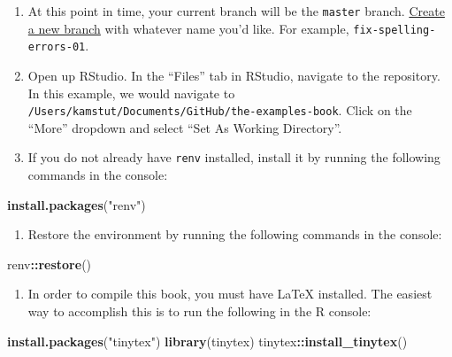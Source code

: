 \documentclass[]{book}
\newenvironment{Shaded}{\begin{snugshade}}{\end{snugshade}}
\newcommand{\KeywordTok}[1]{\textcolor[rgb]{0.13,0.29,0.53}{\textbf{#1}}}
\newcommand{\StringTok}[1]{\textcolor[rgb]{0.31,0.60,0.02}{#1}}
\newcommand{\OperatorTok}[1]{\textcolor[rgb]{0.81,0.36,0.00}{\textbf{#1}}}
\newcommand{\NormalTok}[1]{#1}
\providecommand{\tightlist}{%
  \setlength{\itemsep}{0pt}\setlength{\parskip}{0pt}}
\begin{document}
\begin{enumerate}
\def\labelenumi{\arabic{enumi}.}
\setcounter{enumi}{7}
\tightlist
\item
  At this point in time, your current branch will be the \texttt{master}
  branch. \protect\hyperlink{github-desktop-create-new-branch}{Create a
  new branch} with whatever name you'd like. For example,
  \texttt{fix-spelling-errors-01}.
\item
  Open up RStudio. In the ``Files'' tab in RStudio, navigate to the
  repository. In this example, we would navigate to
  \texttt{/Users/kamstut/Documents/GitHub/the-examples-book}. Click on
  the ``More'' dropdown and select ``Set As Working Directory''.
\item
  If you do not already have \texttt{renv} installed, install it by
  running the following commands in the console:
\end{enumerate}

\begin{Shaded}
\begin{Highlighting}[]
\KeywordTok{install.packages}\NormalTok{(}\StringTok{"renv"}\NormalTok{)}
\end{Highlighting}
\end{Shaded}

\begin{enumerate}
\def\labelenumi{\arabic{enumi}.}
\setcounter{enumi}{10}
\tightlist
\item
  Restore the environment by running the following commands in the
  console:
\end{enumerate}

\begin{Shaded}
\begin{Highlighting}[]
\NormalTok{renv}\OperatorTok{::}\KeywordTok{restore}\NormalTok{()}
\end{Highlighting}
\end{Shaded}

\begin{enumerate}
\def\labelenumi{\arabic{enumi}.}
\setcounter{enumi}{11}
\tightlist
\item
  In order to compile this book, you must have LaTeX installed. The
  easiest way to accomplish this is to run the following in the R
  console:
\end{enumerate}

\begin{Shaded}
\begin{Highlighting}[]
\KeywordTok{install.packages}\NormalTok{(}\StringTok{"tinytex"}\NormalTok{)}
\KeywordTok{library}\NormalTok{(tinytex)}
\NormalTok{tinytex}\OperatorTok{::}\KeywordTok{install_tinytex}\NormalTok{()}
\end{Highlighting}
\end{Shaded}
\end{document}
